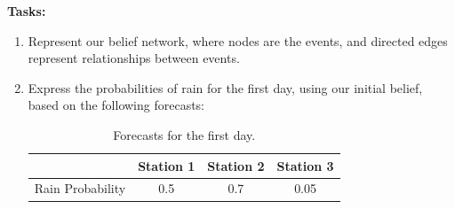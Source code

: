 \documentclass[11pt]{article}
\numberwithin{equation}{section}
\newcommand{\sol}[1]{
    }
\begin{document}
\textbf{Tasks:}
\begin{enumerate}
    \item Represent our belief network, where nodes are the events, and directed edges represent relationships between events.

    \sol{
        \paragraph{Notations}
        \begin{itemize}
            \item $C_i$: Station $i$ predicts correctly the weather.
            \item $R$: It will rain.
        \end{itemize}
        Using those notations, we can draw this belief network representing the relationships between variables:
        
        {\centering
        \begin{tikzpicture}[node distance=1cm and 2cm, every node/.style={minimum width=1cm}, every path/.style={draw, thick}, edge/.style = {->,> = latex', >=stealth}]
            \node (C2) [draw, circle] {$C_2$};
            \node (C1) [draw, circle, left=of C2] {$C_1$};
            \node (C3) [draw, circle, right=of C2] {$C_3$};
            \node (R) [draw, circle, above=of C2] {$R$};
            
            \draw[edge] (R) to (C1);
            \draw[edge] (R) to (C2);
            \draw[edge] (R) to (C3);
        \end{tikzpicture}
        }
    }

    \item Express the probabilities of rain for the first day, using our initial belief, based on the following forecasts:
    \begin{table}[h]
        \centering
        \begin{tabular}{ c | c c c }
          & Station 1 & Station 2 & Station 3 \\ 
         \hline
         Rain Probability & 0.5 & 0.7 & 0.05 \\
        \end{tabular}
        \caption{Forecasts for the first day.}
    \end{table}

    \sol{
        We have an initial belief that we should believe equally in all three stations, that is: $P(C_i) = 1/3$, for $i\in\{1,2,3\}$.
        Additionally, the entries in the table correspond to the rain probabilities given each station $i$'s forecast: $P(R | C_i)$.
        Thus:

}
\end{enumerate}
\end{document}
